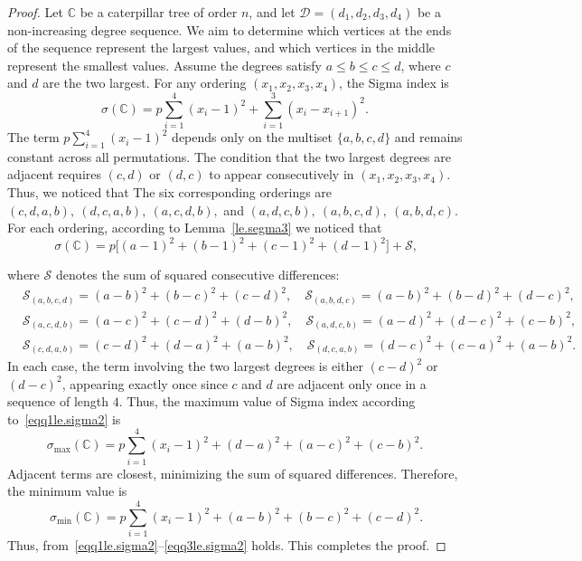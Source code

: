 \documentclass[12pt, a4paper]{article}
\theoremstyle{plain}  %
\theoremstyle{definition}  %
\newcommand{\CC}{\mathbb{C}}
\begin{document}
\begin{proof}
Let $\CC$ be a caterpillar tree of order $n$, and let $\mathscr{D} = (d_1, d_2, d_3, d_4)$ be a non-increasing degree sequence. We aim to determine which vertices at the ends of the sequence represent the largest values, and which vertices in the middle represent the smallest values.  Assume the degrees satisfy $a \leq b \leq c \leq d$, where $c$ and $d$ are the two largest. For any ordering $(x_1,x_2,x_3,x_4)$, the Sigma index is
$$
\sigma(\CC) = p\sum_{i=1}^{4}(x_i-1)^2 + \sum_{i=1}^{3}(x_i-x_{i+1})^2.
$$
The term $p\sum_{i=1}^{4}(x_i-1)^2$ depends only on the multiset $\{a,b,c,d\}$ and remains constant across all permutations. The condition that the two largest degrees are adjacent requires $(c,d)$ or $(d,c)$ to appear consecutively in $(x_1,x_2,x_3,x_4)$. Thus, we noticed that The six corresponding orderings are
$(c,d,a,b),\ (d,c,a,b),\ (a,c,d,b),$ and $(a,d,c,b),\ (a,b,c,d),\ (a,b,d,c).$ For each ordering, according to Lemma~\ref{le.segma3} we noticed that
\begin{equation}~\label{eqq1le.sigma2}
\sigma(\CC)= p\big[(a-1)^2+(b-1)^2+(c-1)^2+(d-1)^2\big] + \mathcal{S},
\end{equation}

where $\mathcal{S}$ denotes the sum of squared consecutive differences:
\begin{align*}
 &\mathcal{S}_{(a,b,c,d)}= (a-b)^2 + (b-c)^2 + (c-d)^2, \quad 
\mathcal{S}_{(a,b,d,c)}= (a-b)^2 + (b-d)^2 + (d-c)^2,\\
&\mathcal{S}_{(a,c,d,b)}= (a-c)^2 + (c-d)^2 + (d-b)^2,\quad
\mathcal{S}_{(a,d,c,b)}= (a-d)^2 + (d-c)^2 + (c-b)^2,\\
&\mathcal{S}_{(c,d,a,b)}= (c-d)^2 + (d-a)^2 + (a-b)^2,\quad
\mathcal{S}_{(d,c,a,b)}= (d-c)^2 + (c-a)^2 + (a-b)^2.
\end{align*}
In each case, the term involving the two largest degrees is either $(c-d)^2$ or $(d-c)^2$, appearing exactly once since $c$ and $d$ are adjacent only once in a sequence of length $4$.
Thus, the maximum value of Sigma index according to~\eqref{eqq1le.sigma2} is 
\begin{equation}
\sigma_{\max}(\CC)=p \sum_{i=1}^{4} (x_i - 1)^2 + (d-a)^2 + (a-c)^2 + (c-b)^2.
\end{equation}
Adjacent terms are closest, minimizing the sum of squared differences. Therefore, the minimum value  is 
\begin{equation}~\label{eqq3le.sigma2}
 \sigma_{\min}(\CC)= p \sum_{i=1}^{4} (x_i - 1)^2 + (a-b)^2 + (b-c)^2 + (c-d)^2.
\end{equation}
Thus, from~\eqref{eqq1le.sigma2}--\eqref{eqq3le.sigma2} holds.
This completes the proof.
\end{proof}
\end{document}

